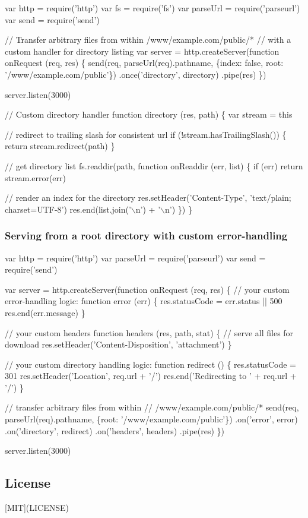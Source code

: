 \begin{DoxyCode}
var http = require('http')
var fs = require('fs')
var parseUrl = require('parseurl')
var send = require('send')

// Transfer arbitrary files from within /www/example.com/public/*
// with a custom handler for directory listing
var server = http.createServer(function onRequest (req, res) \{
  send(req, parseUrl(req).pathname, \{index: false, root: '/www/example.com/public'\})
  .once('directory', directory)
  .pipe(res)
\})

server.listen(3000)

// Custom directory handler
function directory (res, path) \{
  var stream = this

  // redirect to trailing slash for consistent url
  if (!stream.hasTrailingSlash()) \{
    return stream.redirect(path)
  \}

  // get directory list
  fs.readdir(path, function onReaddir (err, list) \{
    if (err) return stream.error(err)

    // render an index for the directory
    res.setHeader('Content-Type', 'text/plain; charset=UTF-8')
    res.end(list.join('\(\backslash\)n') + '\(\backslash\)n')
  \})
\}
\end{DoxyCode}


\subsubsection*{Serving from a root directory with custom error-\/handling}


\begin{DoxyCode}
var http = require('http')
var parseUrl = require('parseurl')
var send = require('send')

var server = http.createServer(function onRequest (req, res) \{
  // your custom error-handling logic:
  function error (err) \{
    res.statusCode = err.status || 500
    res.end(err.message)
  \}

  // your custom headers
  function headers (res, path, stat) \{
    // serve all files for download
    res.setHeader('Content-Disposition', 'attachment')
  \}

  // your custom directory handling logic:
  function redirect () \{
    res.statusCode = 301
    res.setHeader('Location', req.url + '/')
    res.end('Redirecting to ' + req.url + '/')
  \}

  // transfer arbitrary files from within
  // /www/example.com/public/*
  send(req, parseUrl(req).pathname, \{root: '/www/example.com/public'\})
  .on('error', error)
  .on('directory', redirect)
  .on('headers', headers)
  .pipe(res)
\})

server.listen(3000)
\end{DoxyCode}


\subsection*{License}

\mbox{[}M\+IT\mbox{]}(L\+I\+C\+E\+N\+SE) 